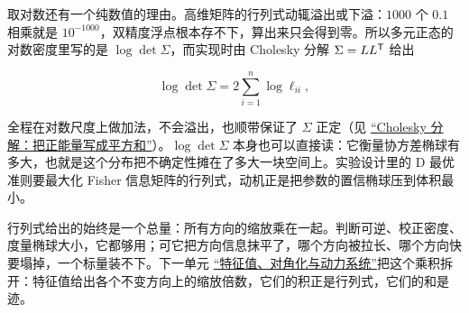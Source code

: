 取对数还有一个纯数值的理由。高维矩阵的行列式动辄溢出或下溢：\(1000\) 个 \(0.1\) 相乘就是 \(10^{-1000}\)，双精度浮点根本存不下，算出来只会得到零。所以多元正态的对数密度里写的是 \(\log\det\Sigma\)，而实现时由 Cholesky 分解 \(\Sigma=LL^{\mathsf{T}}\) 给出

\[
\log\det\Sigma=2\sum_{i=1}^n\log \ell_{ii},
\]

全程在对数尺度上做加法，不会溢出，也顺带保证了 \(\Sigma\) 正定（见 \hyperref[sec:03-Linear-Algebra/06-Symmetric-and-Positive-Definite-Matrices/03]{``Cholesky 分解：把正能量写成平方和''}）。\(\log\det\Sigma\) 本身也可以直接读：它衡量协方差椭球有多大，也就是这个分布把不确定性摊在了多大一块空间上。实验设计里的 D 最优准则要最大化 Fisher 信息矩阵的行列式，动机正是把参数的置信椭球压到体积最小。

行列式给出的始终是一个总量：所有方向的缩放乘在一起。判断可逆、校正密度、度量椭球大小，它都够用；可它把方向信息抹平了，哪个方向被拉长、哪个方向快要塌掉，一个标量装不下。下一单元 \hyperref[ch:020]{``特征值、对角化与动力系统''}把这个乘积拆开：特征值给出各个不变方向上的缩放倍数，它们的积正是行列式，它们的和是迹。
